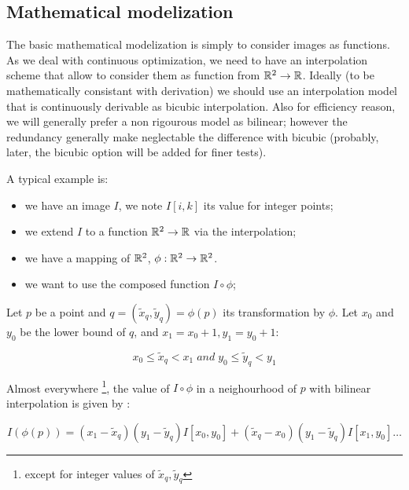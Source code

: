 \subsection{Mathematical modelization}

The basic mathematical modelization is simply to consider images as functions.
As we deal with  continuous optimization, we need to have an interpolation scheme that
allow to consider them as function from $\mathbb{R}^2 \rightarrow \mathbb{R}$.
Ideally (to be mathematically consistant with derivation) we should use an interpolation 
model that is continuously derivable as bicubic interpolation. Also for efficiency reason,
we will generally prefer a non rigourous model as bilinear;  however the redundancy generally make
neglectable the difference with bicubic (probably, later, the bicubic option will be added for finer
tests).

A typical example is:

\begin{itemize}
      \item we have an image $I$, we note $I[i,k]$ its value for integer points;
      \item we extend  $I$ to a function $\mathbb{R}^2 \rightarrow \mathbb{R}$ via the interpolation;
      \item we have a mapping of  $\mathbb{R}^2$,  $\phi : \mathbb{R}^2 \rightarrow \mathbb{R}^2$.
      \item we want to use the composed function $I \circ \phi$;
\end{itemize}

Let $p$ be a point and $q=(\tilde{x}_q,\tilde{y}_q)=\phi(p)$ its transformation by $\phi$. Let $x_0$ and $y_0$
be the lower bound of $q$, and $x_1=x_0+1, y_1 = y_0+1$:

\begin{equation}
	x_0 \leq \tilde{x}_q < x_1   \; and \;  y_0 \leq \tilde{y}_q < y_1
\end{equation}

Almost everywhere \footnote{except for integer values of $\tilde{x}_q,\tilde{y}_q$ }, 
the value of $I \circ \phi$ in a neighourhood of $p$ with  bilinear
interpolation is given by :

\begin{equation}
	I(\phi(p)) =   (x_1-\tilde{x}_q)(y_1-\tilde{y}_q) I[x_0,y_0]  
	             + (\tilde{x}_q-x_0)(y_1-\tilde{y}_q)I[x_1,y_0] \dots 
		     \label{Eq:Bilinear}
\end{equation}

